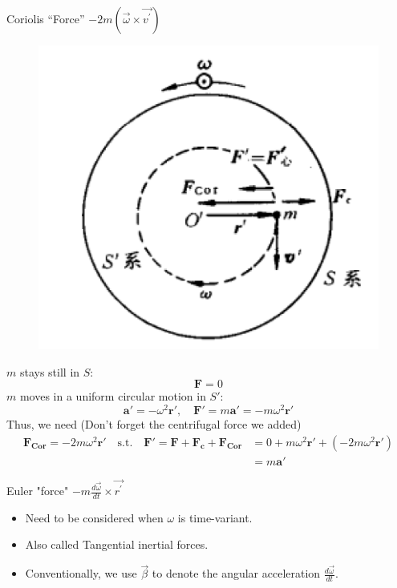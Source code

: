 \documentclass{beamer}
\begin{document}
\begin{frame}{Coriolis ``Force'' $-2 m(\vec{\omega} \times \vec{v^{\prime}})$}
  \begin{figure}[htbp]
  \centering
  \includegraphics[width=0.23 \linewidth, angle =0]{coriolis.png}
  \label{fig:3}
  \end{figure}\pause
  $m$ stays still in $S$:
  $$\mathbf{F} = 0$$\pause
  $m$ moves in a uniform circular motion in $S'$:
  $$\mathbf{a'}=-\omega^2\mathbf{r'},\quad \mathbf{F'}=m\mathbf{a'}=-m\omega^2\mathbf{r'}$$\pause
  Thus, we need (Don't forget the centrifugal force we added)
  \begin{align*}
  \mathbf{F_{Cor}}=-2m\omega^2\mathbf{r'}\quad\text{s.t.}\quad \mathbf{F'}=\mathbf{F}+\mathbf{F_c}+\mathbf{F_{Cor}} & =0+m\omega^2\mathbf{r'}+(-2m\omega^2\mathbf{r'})\\ &=m\mathbf{a'} 
  \end{align*}
\end{frame}

\begin{frame}{Euler "force" $-m \frac{d \vec{\omega}}{d t} \times \vec{r^{\prime}}$}
  \begin{itemize}
    \item Need to be considered when $\omega$ is time-variant.\pause
    \item Also called Tangential inertial forces.\pause
    \item Conventionally, we use $\vec{\beta}$ to denote the angular acceleration $\frac{d \vec{\omega}}{d t}$.
  \end{itemize}
\end{frame}
\end{document}
